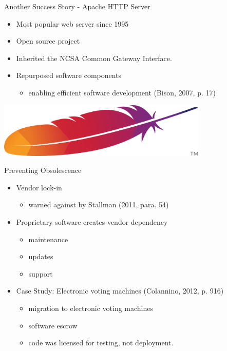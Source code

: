 \begin{frame}{Another Success Story - Apache HTTP Server}
\begin{minipage}{0.5\textwidth}
\begin{itemize}
  \item Most popular web server since 1995
  \item Open source project
  \item Inherited the NCSA Common Gateway Interface.
  \item Repurposed software components
    \begin{itemize}
    \item enabling efficient software development (Bison, 2007, p. 17)
    \end{itemize}
\end{itemize}
\end{minipage}
\begin{minipage}{0.45\textwidth}
\includegraphics[width = 0.75\textwidth]{apache.png}
\end{minipage}
\end{frame}
 

\begin{frame}{Preventing Obsolescence}
\begin{itemize}
  
  \item Vendor lock-in
    \begin{itemize}
      \item warned against by Stallman (2011, para. 54)
    \end{itemize}
  \item Proprietary software creates vendor dependency 
    \begin{itemize}
      \item maintenance
      \item updates
      \item support
    \end{itemize}
  \item Case Study: Electronic voting machines (Colannino, 2012, p. 916)
    \begin{itemize}
      \item migration to electronic voting machines
      \item software escrow
      \item code was licensed for testing, not deployment. 
    \end{itemize}
\end{itemize}
\end{frame} 
